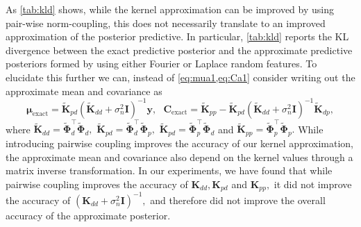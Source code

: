 As \cref{tab:kld} shows, while the kernel approximation can be improved by using pair-wise norm-coupling, this does not necessarily translate to an improved approximation of the posterior predictive.
In particular, \cref{tab:kld} reports the KL divergence between the exact predictive posterior and the approximate predictive posteriors formed by using either Fourier or Laplace random features.
To elucidate this further we can, instead of \cref{eq:mua1,eq:Ca1} consider writing out the approximate mean and covariance as
\begin{equation} 
    \boldsymbol{\mu}_{\text{exact}} = \tilde{\boldsymbol{K}}_{pd} (\tilde{\boldsymbol{K}}_{dd} + \sigma_n^2 \boldsymbol{I})^{-1}\boldsymbol{y},
    ~~~\boldsymbol{C}_{\text{exact}} = \tilde{\boldsymbol{K}}_{pp} - \tilde{\boldsymbol{K}}_{pd} (\tilde{\boldsymbol{K}}_{dd} + \sigma_n^2 \boldsymbol{I})^{-1}\tilde{\boldsymbol{K}}_{dp},
\end{equation}
where $\tilde{\boldsymbol{K}}_{dd} = \tilde{\boldsymbol{\Phi}}_d^\top \tilde{\boldsymbol{\Phi}}_d,$ 
$\tilde{\boldsymbol{K}}_{pd} = \tilde{\boldsymbol{\Phi}}_d^\top \tilde{\boldsymbol{\Phi}}_p,$ $\tilde{\boldsymbol{K}}_{pd} = \tilde{\boldsymbol{\Phi}}_p^\top \tilde{\boldsymbol{\Phi}}_d$ and $\tilde{\boldsymbol{K}}_{pp} = \tilde{\boldsymbol{\Phi}}_p^\top \tilde{\boldsymbol{\Phi}}_p.$
While introducing pairwise coupling improves the accuracy of our kernel approximation, the approximate mean and covariance also depend on the kernel values through a matrix inverse transformation.
In our experiments, we have found that while pairwise coupling improves the accuracy of $\boldsymbol{\boldsymbol{K}}_{dd}, \boldsymbol{\boldsymbol{K}}_{pd}$ and $\boldsymbol{\boldsymbol{K}}_{pp},$ it did not improve the accuracy of $(\boldsymbol{\boldsymbol{K}}_{dd} + \sigma_n^2 \boldsymbol{I})^{-1},$ and therefore did not improve the overall accuracy of the approximate posterior.

